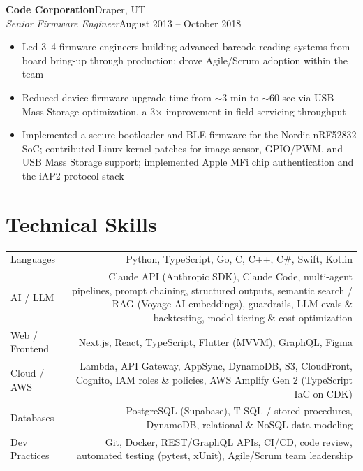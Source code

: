 \documentclass[10.5pt, letterpaper]{article}
\newcommand{\jobentry}[4]{%
  \noindent
  \textbf{\color{accent}#1}\hfill\textcolor{muted}{\small #2}\\
  \textit{#3}\hfill\textcolor{muted}{\small #4}%
}
\begin{document}
\vspace{5pt}

\jobentry{Code Corporation}{Draper, UT}{Senior Firmware Engineer}{August 2013 -- October 2018}
\begin{itemize}
  \item Led 3--4 firmware engineers building advanced barcode reading systems from
        board bring-up through production; drove Agile/Scrum adoption within the team
  \item Reduced device firmware upgrade time from $\sim$3 min to $\sim$60 sec via USB
        Mass Storage optimization, a 3$\times$ improvement in field servicing throughput
  \item Implemented a secure bootloader and BLE firmware for the Nordic nRF52832 SoC;
        contributed Linux kernel patches for image sensor, GPIO/PWM, and USB Mass
        Storage support; implemented Apple MFi chip authentication and the iAP2
        protocol stack
\end{itemize}

\section{Technical Skills}

\begin{tabularx}{\linewidth}{@{}LR@{}}
  Languages          & Python, TypeScript, Go, C, C++, C\#, Swift, Kotlin \\[3pt]
  AI / LLM           & Claude API (Anthropic SDK), Claude Code, multi-agent pipelines,
                       prompt chaining, structured outputs, semantic search / RAG
                       (Voyage AI embeddings), guardrails, LLM evals \& backtesting,
                       model tiering \& cost optimization \\[3pt]
  Web / Frontend     & Next.js, React, TypeScript, Flutter (MVVM), GraphQL, Figma \\[3pt]
  Cloud / AWS        & Lambda, API Gateway, AppSync, DynamoDB, S3, CloudFront,
                       Cognito, IAM roles \& policies, AWS Amplify Gen 2
                       (TypeScript IaC on CDK) \\[3pt]
  Databases          & PostgreSQL (Supabase), T-SQL / stored procedures, DynamoDB,
                       relational \& NoSQL data modeling \\[3pt]
  Dev Practices      & Git, Docker, REST/GraphQL APIs, CI/CD, code review, automated
                       testing (pytest, xUnit), Agile/Scrum team leadership \\[3pt]
\end{tabularx}
\end{document}
